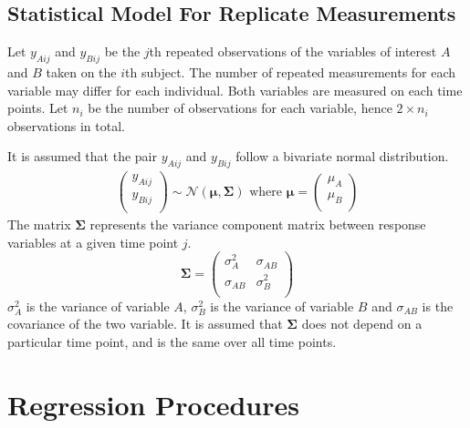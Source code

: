 \documentclass[12pt, a4paper]{report}
\theoremstyle{plain}
\theoremstyle{definition}
\theoremstyle{remark}
\begin{document}
	
	




		\section{Statistical Model For Replicate Measurements}
		Let $y_{Aij}$ and $y_{Bij}$ be the $j$th repeated observations of the variables of interest $A$ and $B$ taken on the $i$th subject. The number of repeated measurements for each variable may differ for each individual.
		Both variables are measured on each time points. Let $n_{i}$ be the number of observations for each variable, hence $2\times n_{i}$ observations in total.
		
		It is assumed that the pair $y_{Aij}$ and $y_{Bij}$ follow a bivariate normal distribution.
		\begin{eqnarray}
		\left(
		\begin{array}{c}
		y_{Aij} \\
		y_{Bij} \\
		\end{array}
		\right) \sim \mathcal{N}(
		\boldsymbol{\mu}, \boldsymbol{\Sigma})\mbox{   where } \boldsymbol{\mu} = \left(
		\begin{array}{c}
		\mu_{A} \\
		\mu_{B} \\
		\end{array}
		\right)
		\end{eqnarray}
		The matrix $\boldsymbol{\Sigma}$ represents the variance component matrix between response variables at a given time point $j$.
		\begin{equation}
		\boldsymbol{\Sigma} = \left( \begin{array}{cc}
		\sigma^2_{A} & \sigma_{AB} \\
		\sigma_{AB} & \sigma^2_{B}\\
		\end{array}\right)
		\end{equation}
		$\sigma^2_{A}$ is the variance of variable $A$, $\sigma^2_{B}$ is the variance of variable $B$ and $\sigma_{AB}$ is the covariance of the two variable. It is assumed that $\boldsymbol{\Sigma}$ does not depend on a particular time point, and is the same over all time points.
		
		
		
		
		
		
		

	\chapter{Regression Procedures}
	
\end{document}
